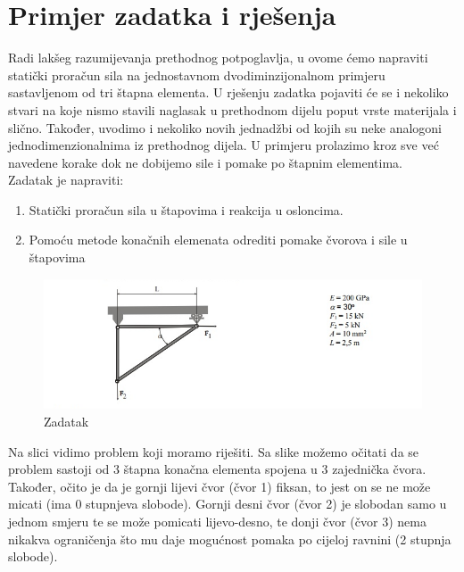 \documentclass[a4paper,twoside,12pt]{memoir} %
\begin{document}
\newpage
\section{Primjer zadatka i rješenja}
Radi lakšeg razumijevanja prethodnog potpoglavlja, u ovome ćemo napraviti statički proračun sila na jednostavnom dvodiminzijonalnom primjeru sastavljenom od tri štapna elementa. U rješenju zadatka pojaviti će se i nekoliko stvari na koje nismo stavili naglasak u prethodnom dijelu poput vrste materijala i slično. Također, uvodimo i nekoliko novih jednadžbi od kojih su neke analogoni jednodimenzionalnima iz prethodnog dijela. U primjeru prolazimo kroz sve već navedene korake dok ne dobijemo sile i pomake po štapnim elementima. \\
Zadatak je napraviti: 
\begin{enumerate}
    \item Statički proračun sila u štapovima i reakcija u osloncima.
    \item Pomoću metode konačnih elemenata odrediti pomake čvorova i sile u štapovima
\end{enumerate}

\begin{figure}[h!t]
\begin{center}
\includegraphics[scale=0.6]{pictures/chapter_fem/problem_glavas.png}
\caption{Zadatak}
\label{fig:problem__not_noted}
\end{center}
\end{figure}

Na slici vidimo problem koji moramo riješiti. Sa slike možemo očitati da se problem sastoji od 3 štapna konačna elementa spojena u 3 zajednička čvora. Također, očito je da je gornji lijevi čvor (čvor 1) fiksan, to jest on se ne može micati (ima 0 stupnjeva slobode). Gornji desni čvor (čvor 2) je slobodan samo u jednom smjeru te se može pomicati lijevo-desno, te donji čvor (čvor 3) nema nikakva ograničenja što mu daje mogućnost pomaka po cijeloj ravnini (2 stupnja slobode). \\
\end{document}
